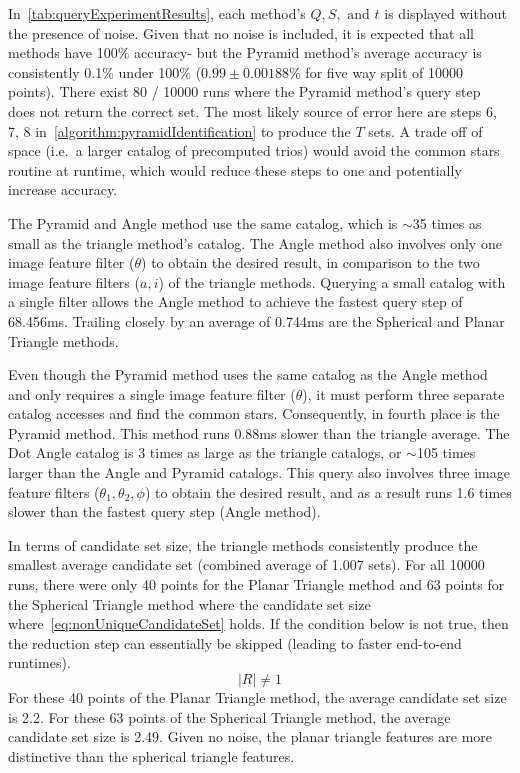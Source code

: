 In~\autoref{tab:queryExperimentResults}, each method's $Q, S, \text{ and } t$ is displayed without the presence of
noise.
Given that no noise is included, it is expected that all methods have 100\% accuracy- but the Pyramid method's
average accuracy is consistently 0.1\% under 100\% ($0.99 \pm 0.00188\%$ for five way split of 10000 points).
There exist 80 / 10000 runs where the Pyramid method's query step does not return the correct set.
The most likely source of error here are steps 6, 7, 8 in~\autoref{algorithm:pyramidIdentification} to produce the
$T$ sets.
A trade off of space (i.e.\ a larger catalog of precomputed trios) would avoid the common stars routine at runtime,
which would reduce these steps to one and potentially increase accuracy.

The Pyramid and Angle method use the same catalog, which is $\sim$35 times as small as the triangle method's catalog.
The Angle method also involves only one image feature filter ($\theta$) to obtain the desired result, in comparison
to the two image feature filters ($a, i$) of the triangle methods.
Querying a small catalog with a single filter allows the Angle method to achieve the fastest query step of 68.456ms.
Trailing closely by an average of 0.744ms are the Spherical and Planar Triangle methods.

Even though the Pyramid method uses the same catalog as the Angle method and only requires a single image feature
filter ($\theta$), it must perform three separate catalog accesses and find the common stars.
Consequently, in fourth place is the Pyramid method.
This method runs 0.88ms slower than the triangle average.
The Dot Angle catalog is 3 times as large as the triangle catalogs, or $\sim$105 times larger than the Angle and Pyramid
catalogs.
This query also involves three image feature filters ($\theta_1, \theta_2, \phi$) to obtain the desired result, and
as a result runs 1.6 times slower than the fastest query step (Angle method).

In terms of candidate set size, the triangle methods consistently produce the smallest average candidate set
(combined average of 1.007 sets).
For all 10000 runs, there were only 40 points for the Planar Triangle method and 63 points for the Spherical Triangle
method where the candidate set size where~\autoref{eq:nonUniqueCandidateSet} holds.
If the condition below is not true, then the reduction step can essentially be skipped (leading to faster end-to-end
runtimes).
\begin{equation}\label{eq:nonUniqueCandidateSet}
    |R| \neq 1
\end{equation}
For these 40 points of the Planar Triangle method, the average candidate set size is 2.2.
For these 63 points of the Spherical Triangle method, the average candidate set size is 2.49.
Given no noise, the planar triangle features are more distinctive than the spherical triangle features.

